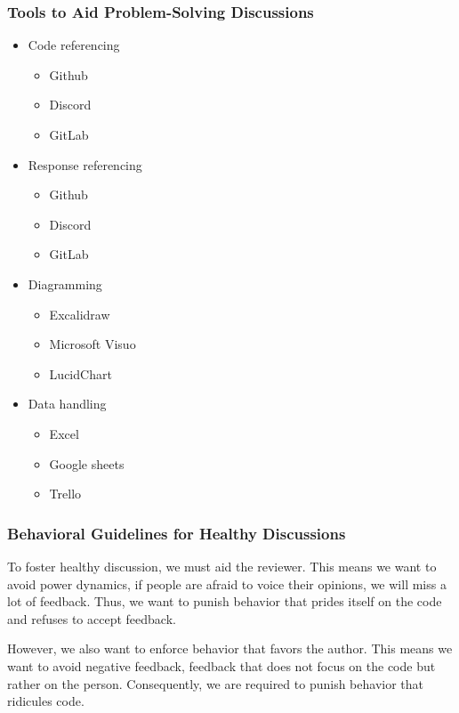 \documentclass{article}
\begin{document}
\subsubsection{Tools to Aid Problem-Solving Discussions}
\begin{itemize}
    \item Code referencing
    \begin{itemize}
        \item Github
        \item Discord
        \item GitLab
    \end{itemize} 
    \item Response referencing 
    \begin{itemize}
        \item Github
        \item Discord
        \item GitLab
    \end{itemize} 
    \item Diagramming\cite{nicole_johnson_increasing_2021}
    \begin{itemize}
        \item Excalidraw 
        \item Microsoft Visuo
        \item LucidChart
    \end{itemize} 
    \item Data handling
    \begin{itemize}
        \item Excel 
        \item Google sheets
        \item Trello
    \end{itemize} 
\end{itemize}

\subsubsection{Behavioral Guidelines for Healthy Discussions}

To foster healthy discussion, we must aid the reviewer. 
This means we want to avoid power dynamics, if people are afraid to voice their opinions, we will miss a lot of feedback.
Thus, we want to punish behavior that prides itself on the code and refuses to accept feedback.

However, we also want to enforce behavior that favors the author.
This means we want to avoid negative feedback, feedback that does not focus on the code but rather on the person.
Consequently, we are required to punish behavior that ridicules code.
\end{document}
